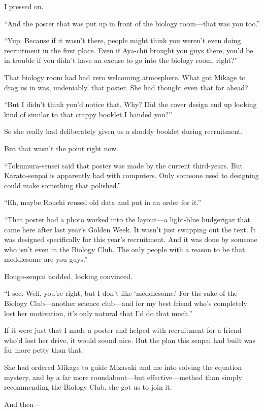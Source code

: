 \documentclass[
    a4paper,
    12pt,
    twoside,
    openany,
    UTF8,
    fontset=windows
]{ctexbook}
\begin{document}
I pressed on.

``And the poster that was put up in front of the biology room---that was you too.''

``Yup. Because if it wasn't there, people might think you weren't even doing recruitment in the first place. Even if Aya-chii brought you guys there, you'd be in trouble if you didn't have an excuse to go into the biology room, right?''

That biology room had had zero welcoming atmosphere. What got Mikage to drag us in was, undeniably, that poster. She had thought even that far ahead?

``But I didn't think you'd notice that. Why? Did the cover design end up looking kind of similar to that crappy booklet I handed you?''

So she really had deliberately given us a shoddy booklet during recruitment.

But that wasn't the point right now.

``Tokumura-sensei said that poster was made by the current third-years. But Karato-senpai is apparently bad with computers. Only someone used to designing could make something that polished.''

``Eh, maybe Rouchi reused old data and put in an order for it.''

``That poster had a photo worked into the layout---a light-blue budgerigar that came here after last year's Golden Week. It wasn't just swapping out the text. It was designed specifically for this year's recruitment. And it was done by someone who isn't even in the Biology Club. The only people with a reason to be that meddlesome are you guys.''

Hongo-senpai nodded, looking convinced.

``I see. Well, you're right, but I don't like `meddlesome.' For the sake of the Biology Club---another science club---and for my best friend who's completely lost her motivation, it's only natural that I'd do that much.''

If it were just that I made a poster and helped with recruitment for a friend who'd lost her drive, it would sound nice. But the plan this senpai had built was far more petty than that.

She had ordered Mikage to guide Mizasaki and me into solving the equation mystery, and by a far more roundabout---but effective---method than simply recommending the Biology Club, she got us to join it.

And then---
\end{document}
